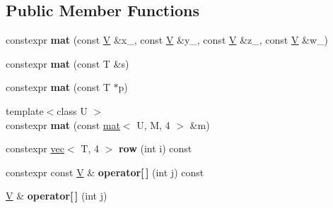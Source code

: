 \subsection*{Public Member Functions}
\begin{DoxyCompactItemize}
\item 
constexpr {\bfseries mat} (const \hyperlink{structlinalg_1_1vec}{V} \&x\+\_\+, const \hyperlink{structlinalg_1_1vec}{V} \&y\+\_\+, const \hyperlink{structlinalg_1_1vec}{V} \&z\+\_\+, const \hyperlink{structlinalg_1_1vec}{V} \&w\+\_\+)\hypertarget{structlinalg_1_1mat_3_01T_00_01M_00_014_01_4_acb82d39b65cdce9daf4e6d5eab606416}{}\label{structlinalg_1_1mat_3_01T_00_01M_00_014_01_4_acb82d39b65cdce9daf4e6d5eab606416}

\item 
constexpr {\bfseries mat} (const T \&s)\hypertarget{structlinalg_1_1mat_3_01T_00_01M_00_014_01_4_a9180c768f750b87fb7eed3e6c8f7773e}{}\label{structlinalg_1_1mat_3_01T_00_01M_00_014_01_4_a9180c768f750b87fb7eed3e6c8f7773e}

\item 
constexpr {\bfseries mat} (const T $\ast$p)\hypertarget{structlinalg_1_1mat_3_01T_00_01M_00_014_01_4_af1ca4c250e77182e992eea98ae85d886}{}\label{structlinalg_1_1mat_3_01T_00_01M_00_014_01_4_af1ca4c250e77182e992eea98ae85d886}

\item 
{\footnotesize template$<$class U $>$ }\\constexpr {\bfseries mat} (const \hyperlink{structlinalg_1_1mat}{mat}$<$ U, M, 4 $>$ \&m)\hypertarget{structlinalg_1_1mat_3_01T_00_01M_00_014_01_4_a01a4719ab56a3d2bb44fe397d436f075}{}\label{structlinalg_1_1mat_3_01T_00_01M_00_014_01_4_a01a4719ab56a3d2bb44fe397d436f075}

\item 
constexpr \hyperlink{structlinalg_1_1vec}{vec}$<$ T, 4 $>$ {\bfseries row} (int i) const \hypertarget{structlinalg_1_1mat_3_01T_00_01M_00_014_01_4_a19fbd3d95543f47132d5662fdfe230be}{}\label{structlinalg_1_1mat_3_01T_00_01M_00_014_01_4_a19fbd3d95543f47132d5662fdfe230be}

\item 
constexpr const \hyperlink{structlinalg_1_1vec}{V} \& {\bfseries operator\mbox{[}$\,$\mbox{]}} (int j) const \hypertarget{structlinalg_1_1mat_3_01T_00_01M_00_014_01_4_a7cdf2f233cc4029eaf5cbd0ba7c0ac74}{}\label{structlinalg_1_1mat_3_01T_00_01M_00_014_01_4_a7cdf2f233cc4029eaf5cbd0ba7c0ac74}

\item 
\hyperlink{structlinalg_1_1vec}{V} \& {\bfseries operator\mbox{[}$\,$\mbox{]}} (int j)\hypertarget{structlinalg_1_1mat_3_01T_00_01M_00_014_01_4_a6f2a988a8f31b9156f1d7e3882b37f3c}{}\label{structlinalg_1_1mat_3_01T_00_01M_00_014_01_4_a6f2a988a8f31b9156f1d7e3882b37f3c}

\end{DoxyCompactItemize}
